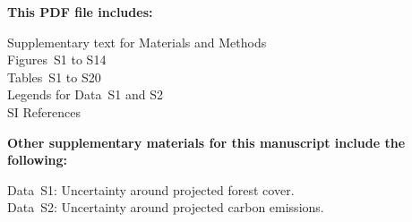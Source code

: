 \textbf{This PDF file includes:}

Supplementary text for Materials and Methods\\
Figures~S1 to S14\\
Tables~S1 to S20\\
Legends for Data~S1 and S2\\
SI References

\vspace{0.5cm}

\textbf{Other supplementary materials for this manuscript include the following:}

Data~S1: Uncertainty around projected forest cover.\\
Data~S2: Uncertainty around projected carbon emissions.

\newpage